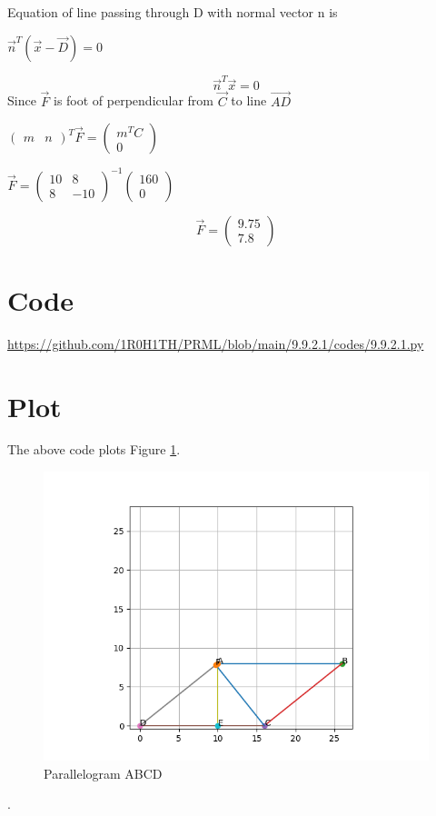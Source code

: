 \documentclass[letterpaper,12pt]{article}
\begin{document}
Equation of line passing through D with normal vector n is
\begin{center}
    $\Vec{n}^T(\Vec{x} - \Vec{D}) = 0$
\end{center}
\begin{equation}
    \Vec{n}^T\Vec{x} = 0
\end{equation}
Since $\Vec{F}$ is foot of perpendicular from $\Vec{C}$ to line $\Vec{AD}$
\begin{center}
    $\begin{pmatrix}m & n\end{pmatrix}^T\Vec{F} = \begin{pmatrix} m^TC \\ 0 \end{pmatrix}$
\end{center}
\begin{center}
    $\Vec{F} = \begin{pmatrix}10 & 8 \\ 8 & -10 \end{pmatrix}^{-1}\begin{pmatrix} 160 \\ 0 \end{pmatrix}$
\end{center}
\begin{equation}
    \Vec{F} = \begin{pmatrix}9.75 \\ 7.8\end{pmatrix}
\end{equation}

\clearpage

\section{Code}
\url{https://github.com/1R0H1TH/PRML/blob/main/9.9.2.1/codes/9.9.2.1.py}

\section{Plot}
The above code plots Figure \ref{fig:fig2}.
\begin{figure}[!ht]
\centering
\includegraphics[width=0.75\columnwidth]{figs/Figure_1.png}
\caption{Parallelogram ABCD}
\label{fig:fig2}
\end{figure}.
\end{document}
